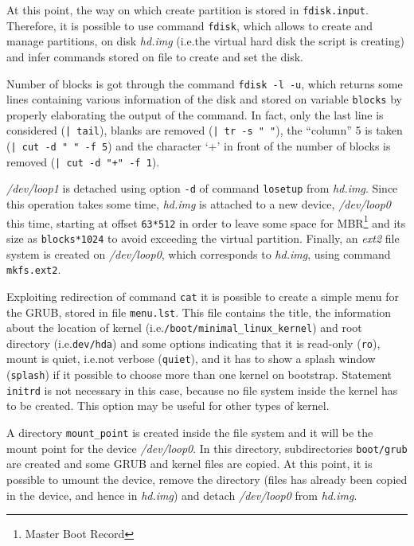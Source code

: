 \documentclass{report}
\begin{document}
At this point, the way on which create partition is stored in \texttt{fdisk.input}. Therefore, it is possible to use command \texttt{fdisk}, which allows to create and manage partitions, on disk \emph{hd.img} (i.e.\@ the virtual hard disk the script is creating) and infer commands stored on file to create and set the disk.

Number of blocks is got through the command \texttt{fdisk -l -u}, which returns some lines containing various information of the disk and stored on variable \texttt{blocks} by properly elaborating the output of the command. In fact, only the last line is considered (\texttt{| tail}), blanks are removed (\texttt{| tr -s " "}), the ``column'' 5 is taken (\texttt{| cut -d " " -f 5}) and the character `+' in front of the number of blocks is removed (\texttt{| cut -d "+" -f 1}). 

\emph{/dev/loop1} is detached using option \texttt{-d} of command \texttt{losetup} from \emph{hd.img}. Since this operation takes some time, \emph{hd.img} is attached to a new device, \emph{/dev/loop0} this time, starting at offset \texttt{63*512} in order to leave some space for MBR\footnote{Master Boot Record} and its size as \texttt{blocks*1024} to avoid exceeding the virtual partition. Finally, an \emph{ext2} file system is created on \emph{/dev/loop0}, which corresponds to \emph{hd.img}, using command \texttt{mkfs.ext2}.

\medskip

Exploiting redirection of command \texttt{cat} it is possible to create a simple menu for the GRUB, stored in file \texttt{menu.lst}. This file contains the title, the information about the location of kernel (i.e.\@ \texttt{/boot/minimal\_linux\_kernel}) and root directory (i.e.\@ \texttt{dev/hda}) and some options indicating that it is read-only (\texttt{ro}), mount is quiet, i.e.\@ not verbose (\texttt{quiet}), and it has to show a splash window (\texttt{splash}) if it possible to choose more than one kernel on bootstrap. Statement \texttt{initrd} is not necessary in this case, because no file system inside the kernel has to be created. This option may be useful for other types of kernel.

A directory \texttt{mount\_point} is created inside the file system and it will be the mount point for the device \emph{/dev/loop0}. In this directory, subdirectories \texttt{boot/grub} are created and some GRUB and kernel files are copied. At this point, it is possible to umount the device, remove the directory (files has already been copied in the device, and hence in \emph{hd.img}) and detach \emph{/dev/loop0} from \emph{hd.img}.
\end{document}
